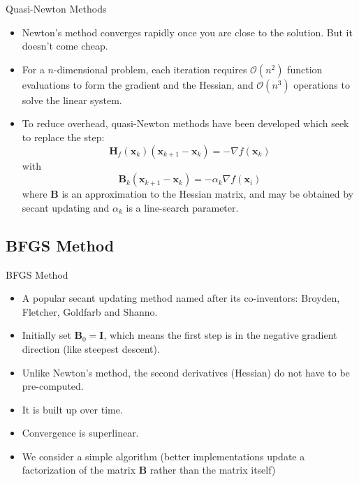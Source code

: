 \documentclass[xcolor=dvipsnames,11pt]{beamer}
\begin{document}
\begin{frame}{Quasi-Newton Methods}
	\begin{itemize}
		\item Newton's method converges rapidly once you are close to the solution. But it doesn't come cheap.
		\item For a $n$-dimensional problem, each iteration requires $\mathcal{O}(n^2)$ function evaluations to form the gradient and the Hessian, and $\mathcal{O}(n^3)$ operations to solve the linear system.
		\item To reduce overhead, quasi-Newton methods have been developed which seek to replace the step:
		$$\mathbf{H}_f(\mathbf{x}_k) (\mathbf{x}_{k+1} - \mathbf{x}_k) = -\nabla f(\mathbf{x}_k)$$
		with
		$$\mathbf{B}_k (\mathbf{x}_{k+1} - \mathbf{x}_k) = - \alpha_k \nabla f(\mathbf{x}_i)$$
		where $\mathbf{B}$ is an approximation to the Hessian matrix, and may be obtained by secant updating and $\alpha_k$ is a line-search parameter.
	\end{itemize}
\end{frame}



\subsection{BFGS Method}

\begin{frame}{BFGS Method}
	\begin{itemize}
		\item A popular secant updating method named after its co-inventors: Broyden, Fletcher, Goldfarb and Shanno.
		\item Initially set $\mathbf{B}_0 = \mathbf{I}$, which means the first step is in the negative gradient direction (like steepest descent).
		\item Unlike Newton's method, the second derivatives (Hessian) do not have to be pre-computed.
		\item It is built up over time.
		\item Convergence is superlinear.
		\item We consider a simple algorithm (better implementations update a factorization of the matrix $\mathbf{B}$ rather than the matrix itself)
	\end{itemize}
\end{frame}
\end{document}
